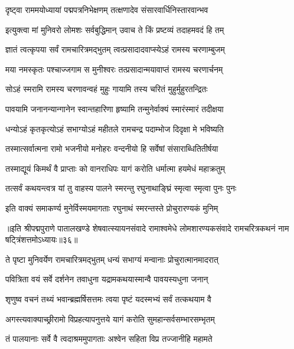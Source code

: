 \twolineshloka
{दृष्ट्वा राममयोध्यायां पद्मपत्रनिभेक्षणम्}
{तत्क्षणादेव संसारवार्धिनिस्तारवान्भव}%

\twolineshloka
{इत्युक्त्वा मां मुनिवरो लोमशः सर्वबुद्धिमान्}
{उवाच ते किं प्रष्टव्यं तदाहमवदं हि तम्}%

\twolineshloka
{ज्ञातं त्वत्कृपया सर्वं रामचारित्रमद्भुतम्}
{त्वत्प्रसादादवाप्स्येऽहं रामस्य चरणाम्बुजम्}%

\twolineshloka
{मया नमस्कृतः पश्चाज्जगाम स मुनीश्वरः}
{तत्प्रसादान्मयावाप्तं रामस्य चरणार्चनम्}%

\twolineshloka
{सोऽहं स्मरामि रामस्य चरणावन्वहं मुहुः}
{गायामि तस्य चरितं मुहुर्मुहुरतन्द्रितः}%

\twolineshloka
{पावयामि जनानन्यान्गानेन स्वान्तहारिणा}
{हृष्यामि तन्मुनेर्वाक्यं स्मारंस्मारं तदीक्षया}%

\twolineshloka
{धन्योऽहं कृतकृत्योऽहं सभाग्योऽहं महीतले}
{रामचन्द्र पदाम्भोज दिदृक्षा मे भविष्यति}%

\twolineshloka
{तस्मात्सर्वात्मना रामो भजनीयो मनोहरः}
{वन्दनीयो हि सर्वेषां संसाराब्धितितीर्षया}%

\twolineshloka
{तस्माद्यूयं किमर्थं वै प्राप्ताः को वानराधिपः}
{यागं करोति धर्मात्मा हयमेधं महाक्रतुम्}%

\twolineshloka
{तत्सर्वं कथयन्त्वत्र यां तु वाहस्य पालने}
{स्मरन्तु रघुनाथाङ्घ्रिं स्मृत्वा स्मृत्वा पुनः पुनः}%

\twolineshloka
{इति वाक्यं समाकर्ण्य मुनेर्विस्मयमागताः}
{रघुनाथं स्मरन्तस्ते प्रोचुरारण्यकं मुनिम्}%

{॥इति श्रीपद्मपुराणे पातालखण्डे शेषवात्स्यायनसंवादे रामाश्वमेधे लोमशारण्यकसंवादे रामचरित्रकथनं नाम षट्त्रिंशत्तमोऽध्यायः॥३६॥}



\twolineshloka
{ते पृष्टा मुनिवर्येण रामचारित्रमद्भुतम्}
{धन्यं सभाग्यं मन्वानाः प्रोचुरात्मानमादरात्}%


\twolineshloka
{पवित्रिता वयं सर्वे दर्शनेन तवाधुना}
{यद्रामकथयास्मान्वै पावयस्यधुना जनान्}%

\twolineshloka
{शृणुष्व वचनं तथ्यं भवान्ब्रह्मर्षिसत्तमः}
{त्वया पृष्टं यदस्मभ्यं सर्वं तत्कथयाम वै}%

\twolineshloka
{अगस्त्यवाक्याच्छ्रीरामो विप्रहत्यापनुत्तये}
{यागं करोति सुमहान्सर्वसम्भारसम्भृतम्}%

\twolineshloka
{तं पालयानाः सर्वे वै त्वदाश्रममुपागताः}
{अश्वेन सहिता विप्र तज्जानीहि महामते}%

